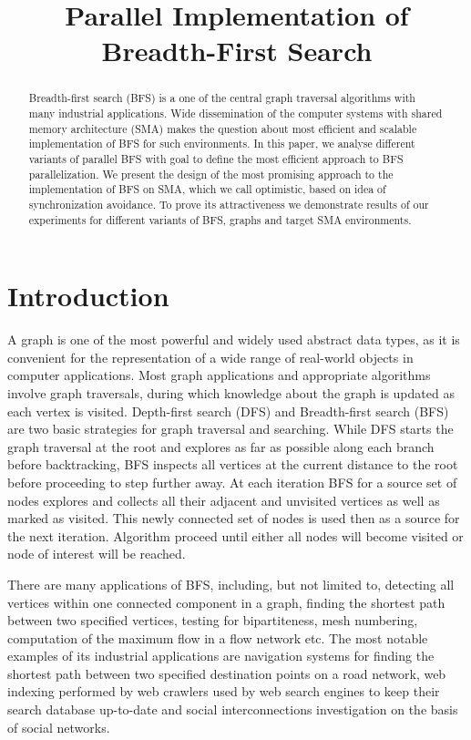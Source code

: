 \documentclass[letterpaper]{article}
\title{Parallel Implementation of Breadth-First Search} %
\begin{document}
	\maketitle

	\begin{abstract} 
		Breadth-first search (BFS) is a one of the central graph traversal algorithms with many industrial applications.
		Wide dissemination of the computer systems with shared memory architecture (SMA) makes the question about most efficient and scalable implementation of BFS for such environments. 
		In this paper, we analyse different variants of parallel BFS with goal to define the most efficient approach to BFS parallelization.
		We present the design of the most promising approach to the implementation of BFS on SMA, which we call optimistic, based on idea of synchronization avoidance.
		To prove its attractiveness we demonstrate results of our experiments for different variants of BFS, graphs and target SMA environments.
	\end{abstract}

	\section{Introduction}\label{sec:intro} %
		A graph is one of the most powerful and widely used abstract data types, as it is convenient for the representation of a wide range of real-world objects in computer applications.
		Most graph applications and appropriate algorithms involve graph traversals, during which knowledge about the graph is updated as each vertex is visited. 
		Depth-first search (DFS) and Breadth-first search (BFS) are two basic strategies for graph traversal and searching.
		While DFS starts the graph traversal at the root and explores as far as possible along each branch before backtracking, BFS inspects all vertices at the current distance to the root before proceeding to step further away. 
		At each iteration BFS for a source set of nodes explores and collects all their adjacent and unvisited vertices as well as marked as visited.  
		This newly connected set of nodes is used then as a source for the next iteration.
		Algorithm proceed until either all nodes will become visited or node of interest will be reached.
		
		There are many applications of BFS, including, but not limited to, detecting all vertices within one connected component in a graph, finding the shortest path between two specified vertices, testing for bipartiteness, mesh numbering, computation of the maximum flow in a flow network etc.
		The most notable examples of its industrial applications are navigation systems for finding the shortest path between two specified destination points on a road network, web indexing performed by web crawlers used by web search engines to keep their search database up-to-date and social interconnections investigation on the basis of social networks. 
		
\end{document}
